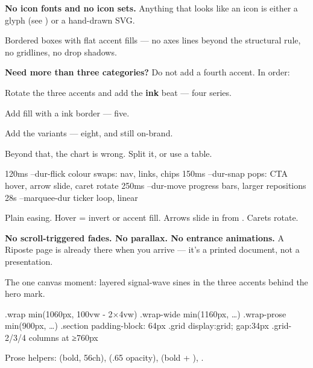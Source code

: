 \documentclass[fontpath=fonts/,logopath=logo/]{riposte-doc}
\begin{document}
\textbf{No icon fonts and no icon sets.} Anything that looks like an icon is either a glyph (see ) or a hand-drawn SVG.



Bordered boxes with flat accent fills — no axes lines beyond the structural rule, no gridlines, no drop shadows.

\textbf{Need more than three categories?} Do not add a fourth accent. In order:

\begin{ripnumbers}
\item Rotate the three accents and add the \textbf{ink} beat — four series.
\item Add  fill with a \ripmono{2px} ink border — five.
\item Add the  variants — eight, and still on-brand.
\item Beyond that, the chart is wrong. Split it, or use a table.
\end{ripnumbers}



\ripcodeopen
{}
\begin{ripcodeblock}
120ms  --dur-flick   colour swaps: nav, links, chips
150ms  --dur-snap    pops: CTA hover, arrow slide, caret rotate
250ms  --dur-move    progress bars, larger repositions
 28s   --marquee-dur ticker loop, linear
\end{ripcodeblock}
\ripcodesizereset\ripcodeclose

Plain easing. Hover = invert or accent fill. Arrows slide in from \ripmono{-5px}. Carets rotate.

\textbf{No scroll-triggered fades. No parallax. No entrance animations.} A Riposte page is already there when you arrive — it's a printed document, not a presentation.

The one canvas moment: layered signal-wave sines in the three accents behind the hero mark.



\ripcodeopen
{}
\begin{ripcodeblock}
.wrap        min(1060px, 100vw - 2×4vw)
.wrap-wide   min(1160px, …)
.wrap-prose  min(900px,  …)
.section     padding-block: 64px
.grid        display:grid; gap:34px
.grid-2/3/4  columns at ≥760px
\end{ripcodeblock}
\ripcodesizereset\ripcodeclose

Prose helpers:  (bold, 56ch),  (.65 opacity),  (bold + ), .

\ripend
\end{document}
